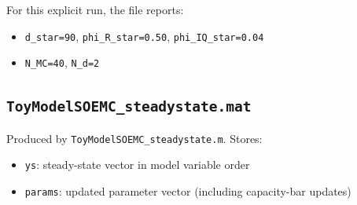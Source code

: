 \documentclass[11pt]{article}
\begin{document}
For this explicit run, the file reports:
\begin{itemize}
\item \texttt{d\_star=90}, \texttt{phi\_R\_star=0.50}, \texttt{phi\_IQ\_star=0.04}
\item \texttt{N\_MC=40}, \texttt{N\_d=2}
\end{itemize}

\subsection*{\texttt{ToyModelSOEMC\_steadystate.mat}}
Produced by \texttt{ToyModelSOEMC\_steadystate.m}. Stores:
\begin{itemize}
\item \texttt{ys}: steady-state vector in model variable order
\item \texttt{params}: updated parameter vector (including capacity-bar updates)
\end{itemize}
\end{document}
